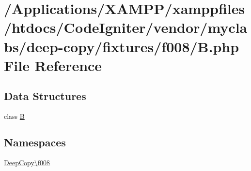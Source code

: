 \hypertarget{f008_2_b_8php}{}\section{/\+Applications/\+X\+A\+M\+P\+P/xamppfiles/htdocs/\+Code\+Igniter/vendor/myclabs/deep-\/copy/fixtures/f008/B.php File Reference}
\label{f008_2_b_8php}
\subsection*{Data Structures}
\begin{DoxyCompactItemize}
\item 
class \mbox{\hyperlink{class_deep_copy_1_1f008_1_1_b}{B}}
\end{DoxyCompactItemize}
\subsection*{Namespaces}
\begin{DoxyCompactItemize}
\item 
 \mbox{\hyperlink{namespace_deep_copy_1_1f008}{Deep\+Copy\textbackslash{}f008}}
\end{DoxyCompactItemize}
